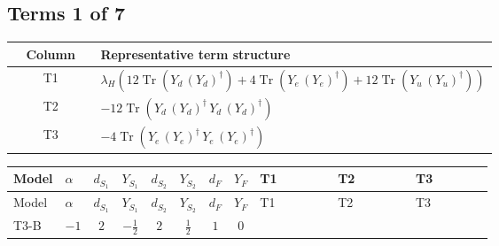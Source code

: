 \documentclass[8pt]{article}
\begin{document}
\begin{landscape}
\subsection*{Terms 1 of 7}
\begin{center}
\begin{tabular}{@{}c >{\raggedright\arraybackslash}p{0.82\linewidth}@{}}
\toprule
Column & Representative term structure \\
\midrule
T1 & \(\displaystyle {\lambda_H} (12 \operatorname{Tr}\!\left({Y_d}\,\left({Y_d}\right)^{\dagger}\right)+4 \operatorname{Tr}\!\left({Y_e}\,\left({Y_e}\right)^{\dagger}\right)+12 \operatorname{Tr}\!\left({Y_u}\,\left({Y_u}\right)^{\dagger}\right))\) \\
\midrule
T2 & \(\displaystyle -12 \operatorname{Tr}\!\left({Y_d}\,\left({Y_d}\right)^{\dagger}\,{Y_d}\,\left({Y_d}\right)^{\dagger}\right)\) \\
\midrule
T3 & \(\displaystyle -4 \operatorname{Tr}\!\left({Y_e}\,\left({Y_e}\right)^{\dagger}\,{Y_e}\,\left({Y_e}\right)^{\dagger}\right)\) \\
\midrule
\bottomrule
\end{tabular}
\end{center}
\smallskip
\tiny
\begin{longtable}{@{}llcccccc >{\raggedright\arraybackslash}p{0.21\linewidth} >{\raggedright\arraybackslash}p{0.21\linewidth} >{\raggedright\arraybackslash}p{0.21\linewidth}@{}}
\toprule
Model & $\alpha$ & $d_{S_1}$ & $Y_{S_1}$ & $d_{S_2}$ & $Y_{S_2}$ & $d_F$ & $Y_F$ & T1 & T2 & T3 \\
\midrule
\endfirsthead
\toprule
Model & $\alpha$ & $d_{S_1}$ & $Y_{S_1}$ & $d_{S_2}$ & $Y_{S_2}$ & $d_F$ & $Y_F$ & T1 & T2 & T3 \\
\midrule
\endhead
T3-B & $-1$ & $2$ & $-\frac{1}{2}$ & $2$ & $\frac{1}{2}$ & $1$ & $0$ & \scriptsize\adjustbox{max width=\linewidth}{$\begin{gathered} {\lambda_H} (12 \operatorname{Tr}\!\left({Y_d}\,\left({Y_d}\right)^{\dagger}\right)+4 \operatorname{Tr}\!\left({Y_e}\,\left({Y_e}\right)^{\dagger}\right)+12 \operatorname{Tr}\!\left({Y_u}\,\left({Y_u}\right)^{\dagger}\right))\end{gathered}$} & \scriptsize\adjustbox{max width=\linewidth}{$\begin{gathered} -12 \operatorname{Tr}\!\left({Y_d}\,\left({Y_d}\right)^{\dagger}\,{Y_d}\,\left({Y_d}\right)^{\dagger}\right)\end{gathered}$} & \scriptsize\adjustbox{max width=\linewidth}{$\begin{gathered} -4 \operatorname{Tr}\!\left({Y_e}\,\left({Y_e}\right)^{\dagger}\,{Y_e}\,\left({Y_e}\right)^{\dagger}\right)\end{gathered}$} \\

\end{longtable}
\end{landscape}
\end{document}
